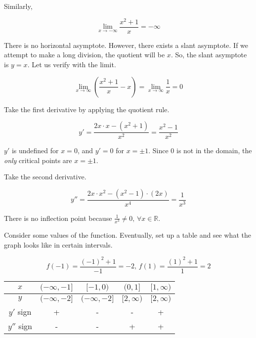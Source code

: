 \documentclass{article}
\begin{document}
\noindent Similarly,

\begin{equation*}\lim_{x\to -\infty} \frac{x^2+ 1}{x} = -\infty\end{equation*}

\hfill

\noindent There is no horizontal asymptote. However, there exists a slant asymptote. If we attempt to make a long division, the quotient will be $x$. So, the slant asymptote is $y=x$. Let us verify with the limit.

\begin{equation*}\lim_{x\to\infty} \left(\frac{x^2+1}{x} - x\right) = \lim_{x\to\infty} \frac{1}{x} = 0\end{equation*}

\hfill

\noindent Take the first derivative by applying the quotient rule.

\begin{equation*}y' = \frac{2x\cdot x - (x^2+1)}{x^2}=\frac{x^2-1}{x^2}\end{equation*}

\hfill

\noindent $y'$ is undefined for $x=0$, and $y'=0$ for $x=\pm1$. Since 0 is not in the domain, the \textit{only} critical points are $x=\pm 1$.

\hfill

\noindent Take the second derivative.

\begin{equation*}y'' = \frac{2x\cdot x^2 - (x^2-1)\cdot(2x)}{x^4}=\frac{1}{x^3}\end{equation*}

\hfill

\noindent There is no inflection point because $\displaystyle \frac{1}{x^3} \neq 0, \, \forall x \in \mathbb{R}$.

\hfill

\noindent Consider some values of the function. Eventually, set up a table and see what the graph looks like in certain intervals.

\begin{equation*}f(-1) = \frac{(-1)^2 + 1}{-1} = -2,\,f(1) = \frac{(1)^2 + 1}{1} = 2\end{equation*}

\begin{center}
    \large
    \begin{tabular}{ |c| c c c c| } 
    \hline
        $x$ & $(-\infty, -1]$ & $[-1, 0)$ & $(0, 1]$ &  $[1, \infty)$ \\
        \hline
        $y$ & $(-\infty, -2]$ & $(-\infty, -2]$ & $[2, \infty)$ & $[2, \infty)$\\
        \hline
        $y'$ sign & + & - & - & + \\
        \hline
        $y''$ sign & - & - & + & + \\
        \hline
    \end{tabular}
\end{center}
\end{document}

